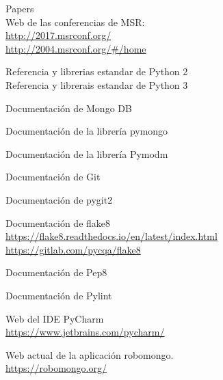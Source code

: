 
\cleardoublepage

\begin{thebibliography}{25}



 Papers \\

 Web de las conferencias de MSR:\\
{\footnotesize \url{http://2017.msrconf.org/}\\ 
\url{http://2004.msrconf.org/#/home}}

 Referencia y librerias estandar de Python 2\\



Referencia y librerais estandar de Python 3

Documentación de Mongo DB

Documentación de la librería pymongo

Documentación de la librería Pymodm

Documentación de Git

Documentación de pygit2


 Documentación de flake8\\
{\footnotesize \url{https://flake8.readthedocs.io/en/latest/index.html}\\ 
\url{https://gitlab.com/pycqa/flake8}}


Documentación de Pep8

Documentación de Pylint




 Web del IDE PyCharm    \\
{\footnotesize \url{https://www.jetbrains.com/pycharm/}}

 Web actual de la aplicación robomongo.   \\
{\footnotesize
\url{https://robomongo.org/}}

\end{thebibliography}